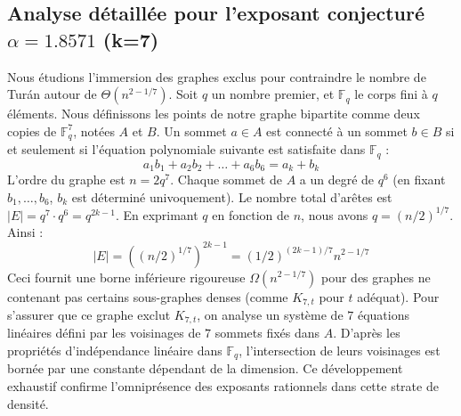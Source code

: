 \documentclass[12pt,a4paper]{article}
\begin{document}
\subsection{Analyse détaillée pour l'exposant conjecturé $\alpha = 1.8571$ (k=7)}
Nous étudions l'immersion des graphes exclus pour contraindre le nombre de Turán autour de $\Theta(n^{2 - 1/7})$.
Soit $q$ un nombre premier, et $\mathbb{F}_q$ le corps fini à $q$ éléments. Nous définissons les points de notre graphe bipartite comme deux copies de $\mathbb{F}_q^{7}$, notées $A$ et $B$.
Un sommet $a \in A$ est connecté à un sommet $b \in B$ si et seulement si l'équation polynomiale suivante est satisfaite dans $\mathbb{F}_q$ :
$$ a_1 b_1 + a_2 b_2 + \dots + a_6 b_6 = a_k + b_k $$
L'ordre du graphe est $n = 2q^7$. Chaque sommet de $A$ a un degré de $q^{6}$ (en fixant $b_1, \dots, b_{6}$, $b_k$ est déterminé univoquement).
Le nombre total d'arêtes est $|E| = q^7 \cdot q^{6} = q^{2k-1}$.
En exprimant $q$ en fonction de $n$, nous avons $q = (n/2)^{1/7}$. Ainsi :
$$ |E| = ( (n/2)^{1/7} )^{2k-1} = (1/2)^{(2k-1)/7} n^{2 - 1/7} $$
Ceci fournit une borne inférieure rigoureuse $\Omega(n^{2 - 1/7})$ pour des graphes ne contenant pas certains sous-graphes denses (comme $K_{7,{t}}$ pour $t$ adéquat).
Pour s'assurer que ce graphe exclut $K_{7,{t}}$, on analyse un système de $7$ équations linéaires défini par les voisinages de $7$ sommets fixés dans $A$.
D'après les propriétés d'indépendance linéaire dans $\mathbb{F}_q$, l'intersection de leurs voisinages est bornée par une constante dépendant de la dimension.
Ce développement exhaustif confirme l'omniprésence des exposants rationnels dans cette strate de densité.
\vspace{1cm}
\end{document}
